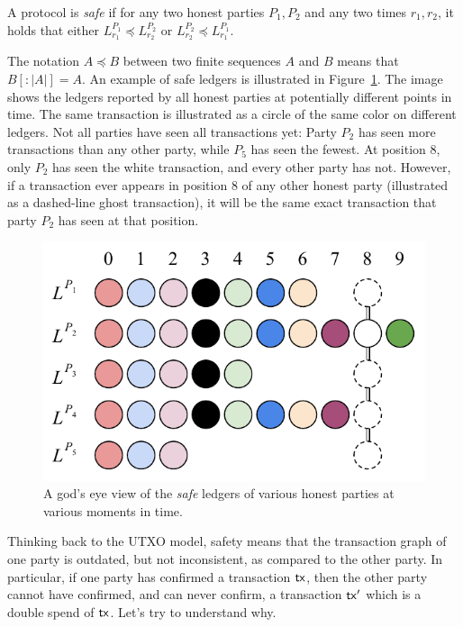 \begin{definition}[Safety]
  A protocol is \emph{safe} if
  for any two honest parties $P_1, P_2$ and any two times $r_1, r_2$, it holds that either
  $L^{P_1}_{r_1} \preccurlyeq L^{P_2}_{r_2}$ or $L^{P_2}_{r_2} \preccurlyeq L^{P_1}_{r_1}$.
\end{definition}

The notation $A \preccurlyeq B$ between two finite sequences $A$ and $B$ means that
$B[{:}|A|] = A$. An example of safe ledgers is illustrated in Figure~\ref{fig.safe-ledgers}.
The image shows the ledgers reported by all honest parties at potentially different points
in time. The same transaction is illustrated as a circle of the same color on different ledgers.
Not all parties have seen all transactions yet: Party $P_2$ has seen more transactions than
any other party, while $P_5$ has seen the fewest. At position $8$, only $P_2$ has seen the white
transaction, and every other party has not. However, if a transaction ever appears in position $8$
of any other honest party (illustrated as a dashed-line ghost transaction), it will be the same
exact transaction that party $P_2$ has seen at that position.

\begin{figure}[h]
    \centering
    \includegraphics[width=0.65 \columnwidth,keepaspectratio]{figures/safe-ledgers.pdf}
    \caption{A god's eye view of the \emph{safe} ledgers of various honest parties at various moments in time.}
    \label{fig.safe-ledgers}
\end{figure}

Thinking back to the UTXO model, safety means that the transaction graph of one party is outdated, but not inconsistent, as compared
to the other party. In particular, if one party has confirmed a transaction $\mathsf{tx}$, then the other party cannot have confirmed, and can
never confirm, a transaction $\mathsf{tx}'$ which is a double spend of $\mathsf{tx}$. Let's try to understand why.

